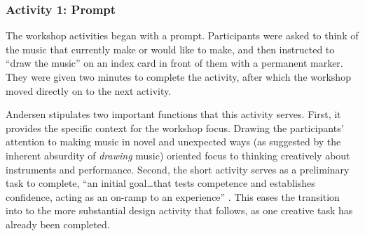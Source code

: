 \documentclass[letterpaper, 12pt]{article}
\begin{document}

\subsubsection{Activity 1: Prompt}
\label{sec:activity-1-prompt}

The workshop activities began with a prompt. Participants were asked to think of the music that currently make or would like to make, and then instructed to ``draw the music'' on an index card in front of them with a permanent marker. They were given two minutes to complete the activity, after which the workshop moved directly on to the next activity.

Andersen stipulates two important functions that this activity serves. First, it provides the specific context for the workshop focus. 
Drawing the participants' attention to making music in novel and unexpected ways (as suggested by the inherent absurdity of \emph{drawing} music) oriented focus to thinking creatively about instruments and performance. Second, the short activity serves as a preliminary task to complete, ``an initial goal\ldots that tests competence and establishes confidence, acting as an on-ramp to an experience'' \citep[p. 5]{Andersen2019}. This eases the transition into to the more substantial design activity that follows, as one creative task has already been completed. 
\end{document}
